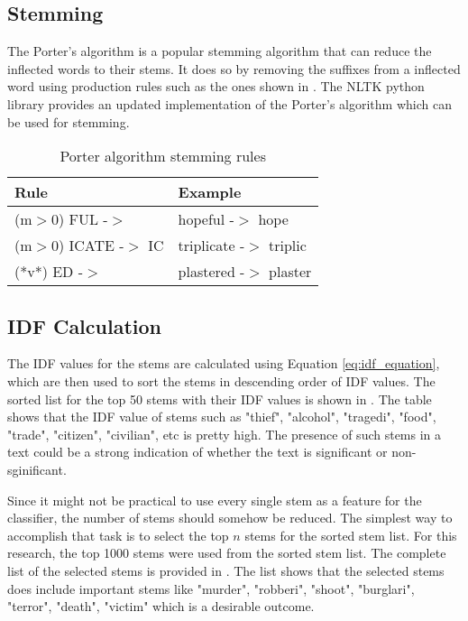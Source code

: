 \subsection{Stemming}
The Porter's algorithm\cite{porter1980algorithm} is a popular stemming algorithm that can reduce the inflected words to their stems. It does so by removing the suffixes from a inflected word using production rules such as the ones shown in . The NLTK python library provides an updated implementation of the Porter's algorithm which can be used for stemming.

\begin{table}
    \centering
    \caption{Porter algorithm stemming rules}
    \label{tbl:porter_algo}
    \begin{tabular}{p{4cm}p{4cm}}
    \toprule
    Rule&Example \\
    \midrule
    (m$>$0) FUL -$>$  &  hopeful -$>$ hope \\
    (m$>$0) ICATE -$>$ IC  & triplicate -$>$ triplic \\
    (*v*) ED -$>$ & plastered -$>$ plaster \\
    \bottomrule
    \end{tabular}
\end{table}

\subsection{IDF Calculation}
The IDF values for the stems are calculated using Equation \eqref{eq:idf_equation}, which are then used to sort the stems in descending order of IDF values. The sorted list for the top 50 stems with their IDF values is shown in . The table shows that the IDF value of stems such as "thief", "alcohol", "tragedi", "food", "trade", "citizen", "civilian", etc is pretty high. The presence of such stems in a text could be a strong indication of whether the text is significant or non-sginificant.

Since it might not be practical to use every single stem as a feature for the classifier, the number of stems should somehow be reduced. The simplest way to accomplish that task is to select the top $n$ stems for the sorted stem list. For this research, the top 1000 stems were used from the sorted stem list. The complete list of the selected stems is provided in . The list shows that the selected stems does include important stems like "murder", "robberi", "shoot", "burglari", "terror", "death", "victim" which is a desirable outcome.

